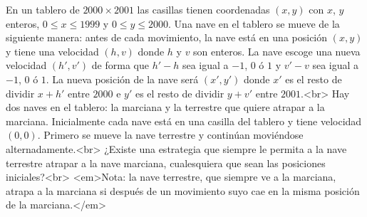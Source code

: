 En un tablero de $2000 \times 2001$ las casillas tienen coordenadas $(x,y)$ con $x$, $y$ enteros, $0 \leq x \leq 1999$ y $0 \leq y \leq 2000$. Una nave en el tablero se mueve de la siguiente manera: antes de cada movimiento, la nave está en una posición $(x,y)$ y tiene una velocidad $(h,v)$ donde $h$ y $v$ son enteros. La nave escoge una nueva velocidad $(h',v')$ de forma que $h' - h$ sea igual a $-1$, $0$ ó $1$ y $v'- v$ sea igual a $-1$, $0$ ó $1$. La nueva posición de la nave será $(x',y')$ donde $x'$ es el resto de dividir $x+h'$ entre $2000$ e $y'$ es el resto de dividir $y + v'$ entre $2001$.<br>
Hay dos naves en el tablero: la marciana y la terrestre que quiere atrapar a la marciana. Inicialmente cada nave está en una casilla del tablero y tiene velocidad $(0,0)$. Primero se mueve la nave terrestre y continúan moviéndose alternadamente.<br>
¿Existe una estrategia que siempre le permita a la nave terrestre atrapar a la nave marciana, cualesquiera que sean las posiciones iniciales?<br>
<em>Nota: la nave terrestre, que siempre ve a la marciana, atrapa a la marciana si después de un movimiento suyo cae en la misma posición de la marciana.</em>
